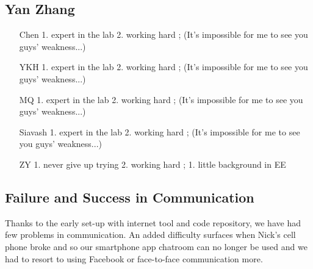 \documentclass[a4paper]{article}
\begin{document}
\subsection{Yan Zhang}
\begin{itemize}
\item[Chen] 1. expert in the lab 2. working hard	;	(It's impossible for me to see you guys' weakness...)
\item[YKH]	1. expert in the lab 2. working hard	;	(It's impossible for me to see you guys' weakness...)
\item[MQ]	1. expert in the lab 2. working hard	;	(It's impossible for me to see you guys' weakness...)
\item[Siavash]	1. expert in the lab 2. working hard	;	(It's impossible for me to see you guys' weakness...)
\item[ZY]	1. never give up trying 2. working hard	;	1. little background in EE
\end{itemize}

\subsection*{Failure and Success in Communication}
Thanks to the early set-up with internet tool and code repository, we have had few problems in communication.
An added difficulty surfaces when Nick's cell phone broke and so our smartphone app chatroom can no longer be used
and we had to resort to using Facebook or face-to-face communication more.
\end{document}
